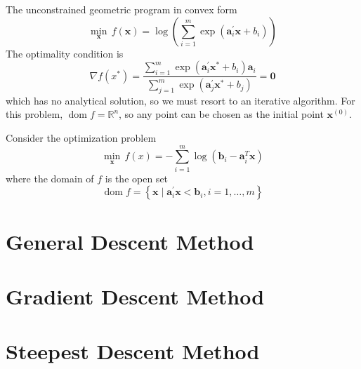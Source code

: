 \begin{example}
	The unconstrained geometric program in convex form
	\begin{equation*}
		\min_{\mathbf{x}}\,f(\mathbf{x})=\log \left(\sum_{i=1}^{m}\exp\left(\mathbf{a}_{i}^{\prime}\mathbf{x}+b_{i}\right)\right)
	\end{equation*}
	The optimality condition is
	\begin{equation*}
		\nabla f\left(x^{*}\right)=\frac{\sum_{i=1}^{m}\exp\left(\mathbf{a}_{i}^{\prime}\mathbf{x}^{*}+b_{i}\right)\mathbf{a}_{i}}{\sum_{j=1}^{m}\exp\left(\mathbf{a}_{j}^{\prime}\mathbf{x}^{*}+b_{j}\right)}=\mathbf{0}
	\end{equation*}
	which has no analytical solution, so we must resort to an iterative algorithm. For this problem, $\operatorname{dom} f=\mathbb{R}^{n}$, so any point can be chosen as the initial point $\mathbf{x}^{(0)}$.
\end{example}

\begin{example}
	Consider the optimization problem
	\begin{equation*}
		\min_{\mathbf{x}}\,f(x)=-\sum_{i=1}^{m}\log\left(\mathbf{b}_{i}-\mathbf{a}_{i}^{T}\mathbf{x}\right)
	\end{equation*}
	where the domain of $f$ is the open set
	\begin{equation*}
		\operatorname{dom}f=\left\{\mathbf{x}\mid\mathbf{a}_{i}^{\prime}\mathbf{x}<\mathbf{b}_{i},i=1,\ldots,m\right\}
	\end{equation*}
\end{example}

\begin{definition}

\end{definition}

\section{General Descent Method}

\section{Gradient Descent Method}

\section{Steepest Descent Method}

